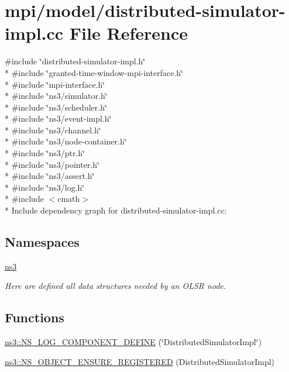 \hypertarget{distributed-simulator-impl_8cc}{}\section{mpi/model/distributed-\/simulator-\/impl.cc File Reference}
\label{distributed-simulator-impl_8cc}
{\ttfamily \#include \char`\"{}distributed-\/simulator-\/impl.\+h\char`\"{}}\\*
{\ttfamily \#include \char`\"{}granted-\/time-\/window-\/mpi-\/interface.\+h\char`\"{}}\\*
{\ttfamily \#include \char`\"{}mpi-\/interface.\+h\char`\"{}}\\*
{\ttfamily \#include \char`\"{}ns3/simulator.\+h\char`\"{}}\\*
{\ttfamily \#include \char`\"{}ns3/scheduler.\+h\char`\"{}}\\*
{\ttfamily \#include \char`\"{}ns3/event-\/impl.\+h\char`\"{}}\\*
{\ttfamily \#include \char`\"{}ns3/channel.\+h\char`\"{}}\\*
{\ttfamily \#include \char`\"{}ns3/node-\/container.\+h\char`\"{}}\\*
{\ttfamily \#include \char`\"{}ns3/ptr.\+h\char`\"{}}\\*
{\ttfamily \#include \char`\"{}ns3/pointer.\+h\char`\"{}}\\*
{\ttfamily \#include \char`\"{}ns3/assert.\+h\char`\"{}}\\*
{\ttfamily \#include \char`\"{}ns3/log.\+h\char`\"{}}\\*
{\ttfamily \#include $<$cmath$>$}\\*
Include dependency graph for distributed-\/simulator-\/impl.cc\+:
\subsection*{Namespaces}
\begin{DoxyCompactItemize}
\item 
 \hyperlink{namespacens3}{ns3}
\begin{DoxyCompactList}\small\item\em Here are defined all data structures needed by an O\+L\+SR node. \end{DoxyCompactList}\end{DoxyCompactItemize}
\subsection*{Functions}
\begin{DoxyCompactItemize}
\item 
\hyperlink{namespacens3_a317910a81f36ab80fea6fcd9ca0232c4}{ns3\+::\+N\+S\+\_\+\+L\+O\+G\+\_\+\+C\+O\+M\+P\+O\+N\+E\+N\+T\+\_\+\+D\+E\+F\+I\+NE} (\char`\"{}Distributed\+Simulator\+Impl\char`\"{})
\item 
\hyperlink{namespacens3_a9987ddb56e49bd1db5c2e713de1713f5}{ns3\+::\+N\+S\+\_\+\+O\+B\+J\+E\+C\+T\+\_\+\+E\+N\+S\+U\+R\+E\+\_\+\+R\+E\+G\+I\+S\+T\+E\+R\+ED} (Distributed\+Simulator\+Impl)
\end{DoxyCompactItemize}
